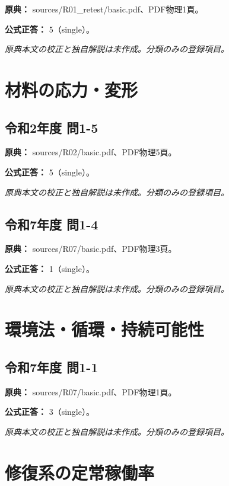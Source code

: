 \noindent\textbf{原典：} sources/R01\_retest/basic.pdf、PDF物理1頁。

\textbf{公式正答：} 5（single）。

\par\textit{原典本文の校正と独自解説は未作成。分類のみの登録項目。}

\section{材料の応力・変形}

\subsection{令和2年度 問1-5}
\label{q:r02-reg-basic-1-5}

\noindent\textbf{原典：} sources/R02/basic.pdf、PDF物理5頁。

\textbf{公式正答：} 5（single）。

\par\textit{原典本文の校正と独自解説は未作成。分類のみの登録項目。}

\subsection{令和7年度 問1-4}
\label{q:r07-reg-basic-1-4}

\noindent\textbf{原典：} sources/R07/basic.pdf、PDF物理3頁。

\textbf{公式正答：} 1（single）。

\par\textit{原典本文の校正と独自解説は未作成。分類のみの登録項目。}

\section{環境法・循環・持続可能性}

\subsection{令和7年度 問1-1}
\label{q:r07-reg-basic-1-1}

\noindent\textbf{原典：} sources/R07/basic.pdf、PDF物理1頁。

\textbf{公式正答：} 3（single）。

\par\textit{原典本文の校正と独自解説は未作成。分類のみの登録項目。}

\section{修復系の定常稼働率}

